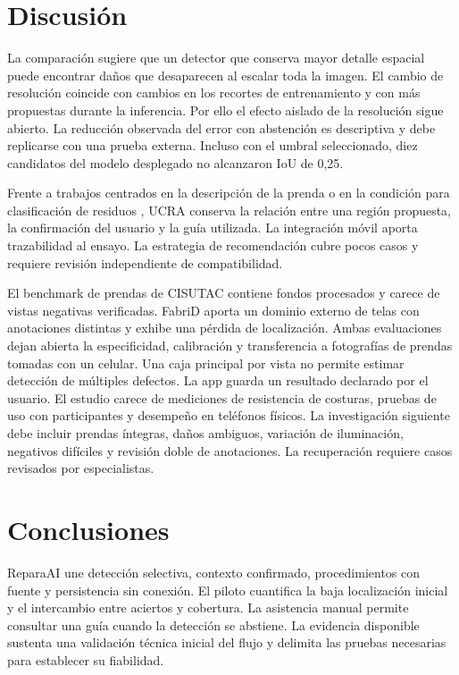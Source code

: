 \documentclass[conference,a4paper]{IEEEtran}
\begin{document}
\section{Discusión}
La comparación sugiere que un detector que conserva mayor detalle espacial puede encontrar daños que desaparecen al escalar toda la imagen. El cambio de resolución coincide con cambios en los recortes de entrenamiento y con más propuestas durante la inferencia. Por ello el efecto aislado de la resolución sigue abierto. La reducción observada del error con abstención es descriptiva y debe replicarse con una prueba externa. Incluso con el umbral seleccionado, diez candidatos del modelo desplegado no alcanzaron IoU de 0,25.

Frente a trabajos centrados en la descripción de la prenda \cite{ge2019} o en la condición para clasificación de residuos \cite{nauman,cisutac}, UCRA conserva la relación entre una región propuesta, la confirmación del usuario y la guía utilizada. La integración móvil aporta trazabilidad al ensayo. La estrategia de recomendación cubre pocos casos y requiere revisión independiente de compatibilidad.

El benchmark de prendas de CISUTAC contiene fondos procesados y carece de vistas negativas verificadas. FabriD aporta un dominio externo de telas con anotaciones distintas y exhibe una pérdida de localización. Ambas evaluaciones dejan abierta la especificidad, calibración y transferencia a fotografías de prendas tomadas con un celular. Una caja principal por vista no permite estimar detección de múltiples defectos. La app guarda un resultado declarado por el usuario. El estudio carece de mediciones de resistencia de costuras, pruebas de uso con participantes y desempeño en teléfonos físicos. La investigación siguiente debe incluir prendas íntegras, daños ambiguos, variación de iluminación, negativos difíciles y revisión doble de anotaciones. La recuperación requiere casos revisados por especialistas.

\section{Conclusiones}
ReparaAI une detección selectiva, contexto confirmado, procedimientos con fuente y persistencia sin conexión. El piloto cuantifica la baja localización inicial y el intercambio entre aciertos y cobertura. La asistencia manual permite consultar una guía cuando la detección se abstiene. La evidencia disponible sustenta una validación técnica inicial del flujo y delimita las pruebas necesarias para establecer su fiabilidad.
\end{document}
